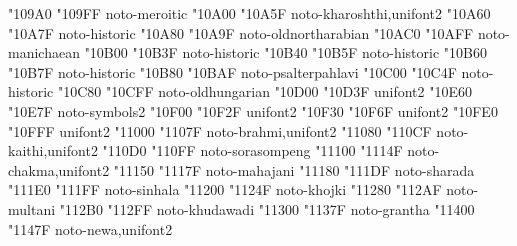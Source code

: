 \documentclass{article}
\begin{document}
                               { "109A0} { "109FF} {noto-meroitic}
                                     { "10A00} { "10A5F} {noto-kharoshthi,unifont2}
                              { "10A60} { "10A7F} {noto-historic}
                              { "10A80} { "10A9F} {noto-oldnortharabian}
                                     { "10AC0} { "10AFF} {noto-manichaean}
                                        { "10B00} { "10B3F} {noto-historic}
                         { "10B40} { "10B5F} {noto-historic}
                          { "10B60} { "10B7F} {noto-historic}
                                { "10B80} { "10BAF} {noto-psalterpahlavi}
                                     { "10C00} { "10C4F} {noto-historic}
                                  { "10C80} { "10CFF} {noto-oldhungarian}
                                { "10D00} { "10D3F} {unifont2}
                           { "10E60} { "10E7F} {noto-symbols2}
                                    { "10F00} { "10F2F} {unifont2}
                                        { "10F30} { "10F6F} {unifont2}
                                        { "10FE0} { "10FFF} {unifont2}
                                         { "11000} { "1107F} {noto-brahmi,unifont2}
                                         { "11080} { "110CF} {noto-kaithi,unifont2}
                                   { "110D0} { "110FF} {noto-sorasompeng}
                                         { "11100} { "1114F} {noto-chakma,unifont2}
                                       { "11150} { "1117F} {noto-mahajani}
                                        { "11180} { "111DF} {noto-sharada}
                        { "111E0} { "111FF} {noto-sinhala}
                                         { "11200} { "1124F} {noto-khojki}
                                        { "11280} { "112AF} {noto-multani}
                                      { "112B0} { "112FF} {noto-khudawadi}
                                        { "11300} { "1137F} {noto-grantha}
                                           { "11400} { "1147F} {noto-newa,unifont2}
\end{document}

